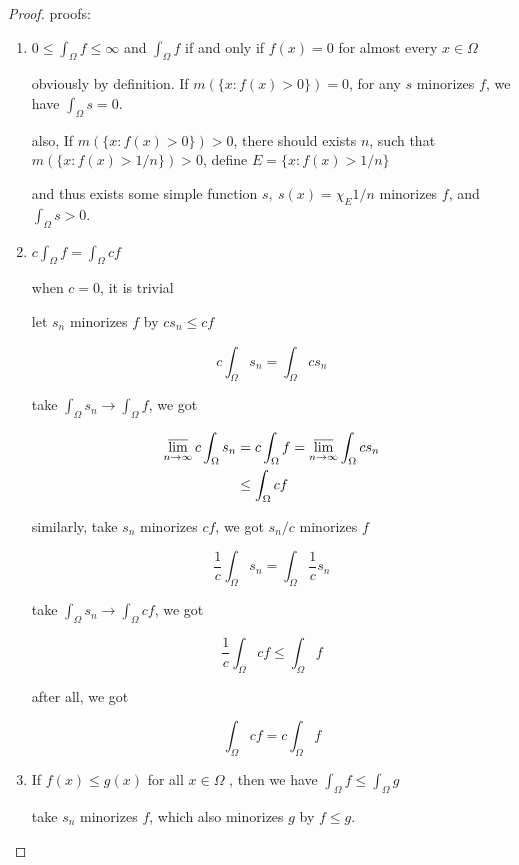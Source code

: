 \begin{proof}
    proofs:

    \begin{enumerate}
        \item $0 \le \int_{\Omega}f \le \infty$ and $\int_{\Omega} f$ if and only if $f(x) = 0$
for almost every $x \in \Omega$

        obviously by definition. If $m(\{ x: f(x) > 0\}) = 0$, for any $s$ minorizes $f$, we have $\int_{\Omega}s = 0$.

        also, If $m(\{ x: f(x) > 0\}) > 0$, there should exists $n$, such that $m(\{ x: f(x) > 1/n\}) > 0$, define $E = \{ x: f(x) > 1/n\}$ 

        and thus exists some simple function $s, \: s(x) = \chi_{E} 1/n$ minorizes $f$, and $\int_{\Omega}s > 0$.

        \item $c \int_{\Omega}f  = \int_{\Omega}cf$

        when $c = 0$, it is trivial

        let $s_n$ minorizes $f$ by $cs_n \le cf$
        
        \[
            c\int_{\Omega}s_n = \int_{\Omega}cs_n
        \]

        take $\int_{\Omega}s_n \to \int_{\Omega}f$, we got

        \begin{align*}
            \varlimsup_{n \to \infty}c\int_{\Omega}s_n &= c\int_{\Omega}f = \varlimsup_{n \to \infty}\int_{\Omega}cs_n \\
            & \le \int_{\Omega}cf
        \end{align*}

        similarly, take $s_n$ minorizes $ cf$, we got $s_n/c$ minorizes $f$

        \[
            \frac{1}{c}\int_{\Omega}s_n = \int_{\Omega}\frac{1}{c}s_n
        \]

        take $\int_{\Omega}s_n \to \int_{\Omega}cf$, we got

        \[
            \frac{1}{c} \int_{\Omega}cf \le \int_{\Omega}f
        \]

        after all, we  got

        \[
        \int_{\Omega}cf = c\int_{\Omega}f
        \]

        \item If $f (x) \le g(x)$ for all $x \in \Omega$ , then we have $\int_{\Omega} f \le \int_{\Omega} g$

        take $s_n$ minorizes $f$, which also minorizes $g$ by $f \le g$.


\end{enumerate}
\end{proof}
